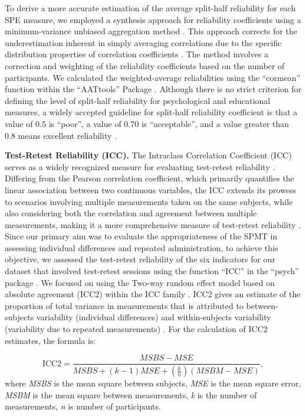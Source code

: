 \documentclass[sn-apa]{sn-jnl}%
\theoremstyle{thmstyleone}%
\theoremstyle{thmstyletwo}%
\theoremstyle{thmstylethree}%
\begin{document}
To derive a more accurate estimation of the average split-half reliability for each SPE measure, we employed a synthesis approach for reliability coefficients using a minimum-variance unbiased aggregation method \parencite{alexander1990note,olkin1958unbiased}. This approach corrects for the underestimation inherent in simply averaging correlations due to the specific distribution properties of correlation coefficients \parencite{shieh2010estimation}. The method involves a correction and weighting of the reliability coefficients based on the number of participants. We calculated the weighted-average reliabilities using the ``cormean” function within the ``AATtools” Package \parencite{kahveci2020aattools}. Although there is no strict criterion for defining the level of split-half reliability for psychological and educational measures, a widely accepted guideline for split-half reliability coefficient is that a value of 0.5 is “poor”, a value of 0.70 is “acceptable”, and a value greater than 0.8 means excellent reliability \parencite{cicchetti1981developing}.  

\textbf{Test-Retest Reliability (ICC).} The Intraclass Correlation Coefficient (ICC) serves as a widely recognized measure for evaluating test-retest reliability \parencite{fisher1992statistical}. Differing from the Pearson correlation coefficient, which primarily quantifies the linear association between two continuous variables, the ICC extends its prowess to scenarios involving multiple measurements taken on the same subjects, while also considering both the correlation and agreement between multiple measurements, making it a more comprehensive measure of test-retest reliability \parencite{koo2016a}. 
Since our primary aim was to evaluate the appropriateness of the SPMT in assessing individual differences and repeated administration, to achieve this objective, we assessed the test-retest reliability of the six indicators for our dataset that involved test-retest sessions using the function ``ICC” in the “psych” package \parencite{revelle2017psych}. We focused on using the Two-way random effect model based on absolute agreement (ICC2) within the ICC family \parencite{chen2018intraclass,xu2023rex,koo2016a}. ICC2 gives an estimate of the proportion of total variance in measurements that is attributed to between-subjects variability (individual differences) and within-subjects variability (variability due to repeated measurements) \parencite{xu2023rex}. For the calculation of ICC2 estimates, the formula is:

\begin{equation}
	\text{ICC2}=\frac{M S B S-M S E}{M S B S+(k-1) M S E+\left(\frac{k}{n}\right)(M S B M-M S E)},
\end{equation}
where \textit{MSBS} is the mean square between subjects, \textit{MSE} is the mean square error, \textit{MSBM} is the mean square between measurements, \textit{k} is the number of measurements, \textit{n} is number of participants. 
\end{document}
